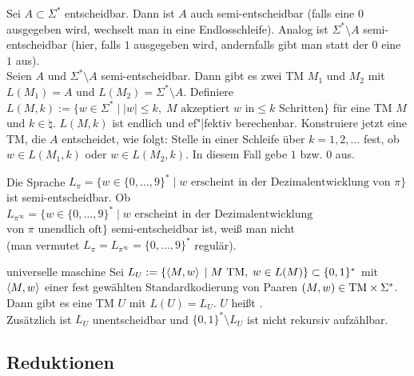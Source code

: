 \begin{Beweis}
    Sei $A \subset \Sigma^\ast$ entscheidbar.
    Dann ist $A$ auch semi-entscheidbar (falls eine $0$ ausgegeben wird, wechselt man in eine
    Endlosschleife).
    Analog ist $\Sigma^\ast \setminus A$ semi-entscheidbar (hier, falls $1$ ausgegeben wird,
    andernfalls gibt man statt der $0$ eine $1$ aus).\\
    Seien $A$ und $\Sigma^\ast \setminus A$ semi-entscheidbar.
    Dann gibt es zwei TM $M_1$ und $M_2$ mit $L(M_1) = A$ und $L(M_2) = \Sigma^\ast \setminus A$.
    Definiere $L(M, k) := \{w \in \Sigma^\ast \;|\;
    |w| \le k,\; M \text{ akzeptiert } w \text { in} \le k \text{ Schritten}\}$
    für eine TM $M$ und $k \in \natural$.
    $L(M, k)$ ist endlich und ef"|fektiv berechenbar.
    Konstruiere jetzt eine TM, die $A$ entscheidet, wie folgt:
    Stelle in einer Schleife über $k = 1, 2, \dotsc$ fest,
    ob $w \in L(M_1, k)$ oder $w \in L(M_2, k)$.
    In diesem Fall gebe $1$ bzw. $0$ aus.
\end{Beweis}

\begin{Bsp}
    Die Sprache $L_\pi = \{w \in \{0, \dotsc, 9\}^\ast \;|\; w \text{ erscheint in der
    Dezimalentwicklung von } \pi\}$ ist semi-entscheidbar.
    Ob $L_{\pi^\infty} = \{w \in \{0, \dotsc, 9\}^\ast \;|\; w \text{ erscheint in der
    Dezimalentwicklung }$ $\text{von } \pi \text{ unendlich oft}\}$ semi-entscheidbar ist,
    weiß man nicht\\
    (man vermutet $L_\pi = L_{\pi^\infty} = \{0, \dotsc, 9\}^\ast$ regulär).
\end{Bsp}

\linie

\begin{Satz}{universelle maschine}
    Sei $L_U := \{\left\langle M, w\right\rangle \;|\; M \text{ TM},\; w \in L(M)\} \subset \{0, 1\}^\ast$
    mit $\left\langle M, w\right\rangle$ einer fest gewählten Standardkodierung von Paaren
    $(M, w) \in \text{TM} \times \Sigma^\ast$.\\
    Dann gibt es eine TM $U$ mit $L(U) = L_U$.
    $U$ heißt .\\
    Zusätzlich ist $L_U$ unentscheidbar und
    $\{0, 1\}^\ast \setminus L_U$ ist nicht rekursiv aufzählbar.
\end{Satz}

\pagebreak

\subsection{%
    Reduktionen%
}

